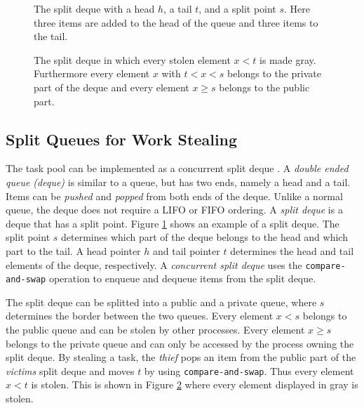 \begin{figure}
	\centering
	
	\caption{The split deque with a head $h$, a tail $t$, and a split point $s$. Here three items are added to the head of the queue and three items to the tail.}
	\label{fig:deque1}
\end{figure}

\begin{figure}
	\centering
	
	\caption{The split deque in which every stolen element $x < t$ is made gray. Furthermore every element $x$ with $t < x < s$ belongs to the private part of the deque and every element $x \geq s$ belongs to the public part.}
	\label{fig:deque2}
\end{figure}

\subsection{Split Queues for Work Stealing}
The task pool can be implemented as a concurrent split deque \cite{lace}. A \emph{double ended queue (deque)} is similar to a queue, but has two ends, namely a head and a tail. Items can be \emph{pushed} and \emph{popped} from both ends of the deque. Unlike a normal queue, the deque does not require a LIFO or FIFO ordering. A \emph{split deque} is a deque that has a split point. Figure \ref{fig:deque1} shows an example of a split deque. The split point $s$ determines which part of the deque belongs to the head and which part to the tail. A head pointer $h$ and tail pointer $t$ determines the head and tail elements of the deque, respectively. A \emph{concurrent split deque} uses the \texttt{compare-and-swap} operation to enqueue and dequeue items from the split deque. 

The split deque can be splitted into a public and a private queue, where $s$ determines the border between the two queues. Every element $x < s$ belongs to the public queue and can be stolen by other processes. Every element $x \geq s$ belongs to the private queue and can only be accessed by the process owning the split deque. By stealing a task, the \emph{thief} pops an item from the public part of the \emph{victims} split deque and moves $t$ by using \texttt{compare-and-swap}. Thus every element $x < t$ is stolen. This is shown in Figure \ref{fig:deque2} where every element displayed in gray is stolen. 

